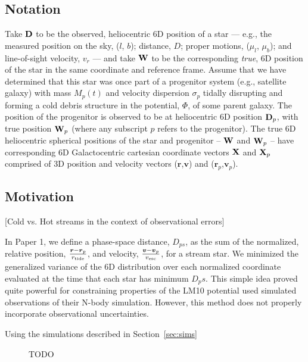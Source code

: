 \documentclass[letterpaper,12pt,preprint]{aastex}
\newcommand{\D}{{\bf D}}
\newcommand{\W}{{\bf W}}
\newcommand{\X}{{\bf X}}
\newcommand{\rtide}{r_{\rm tide}}
\newcommand{\bsr}{\boldsymbol r}
\newcommand{\bsv}{\boldsymbol v}
\newcommand{\paperone}{Paper 1}
\begin{document}
\subsection{Notation}
Take $\D$ to be the observed, heliocentric 6D position of a star --- e.g., the measured position on the sky, ($l$, $b$); distance, $D$; proper motions, ($\mu_l$, $\mu_b$); and line-of-sight velocity, $v_r$ --- and take $\W$ to be the corresponding \emph{true}, 6D position of the star in the same coordinate and reference frame. Assume that we have determined that this star was once part of a progenitor system (e.g., satellite galaxy) with mass $M_p(t)$ and velocity dispersion $\sigma_p$ tidally disrupting and forming a cold debris structure in the potential, $\Phi$, of some parent galaxy. The position of the progenitor is observed to be at heliocentric 6D position $\D_p$, with true position $\W_p$ (where any subscript $p$ refers to the progenitor). The true 6D heliocentric spherical positions of the star and progenitor -- $\W$ and $\W_p$ -- have corresponding 6D Galactocentric cartesian coordinate vectors $\X$ and $\X_p$ comprised of 3D position and velocity vectors ($\bsr$,$\bsv$) and ($\bsr_p$,$\bsv_p$). 

\subsection{Motivation}

[Cold vs. Hot streams in the context of observational errors]

In \paperone, we define a phase-space distance, $D_{ps}$, as the sum of the normalized, relative position, $\frac{\bsr-\bsr_p}{\rtide}$, and velocity, $\frac{\bsv-\bsv_p}{v_{\rm esc}}$, for a stream star. We minimized the generalized variance of the 6D distribution over each normalized coordinate evaluated at the time that each star has minimum $D_ps$. This simple idea proved quite powerful for constraining properties of the LM10 potential used simulated observations of their N-body simulation. However, this method does not properly incorporate observational uncertainties. 

Using the simulations described in Section~\ref{sec:sims}

\begin{figure}[h]
\begin{center}
\caption{ TODO }\label{fig:reldist}
\end{center}
\end{figure}
\end{document}
